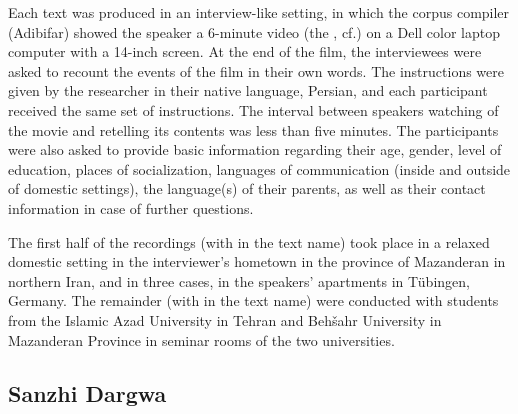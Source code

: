 Each text was produced in an interview-like setting, in which the corpus compiler (Adibifar) showed the speaker a 6-minute video (the , cf.\@ {}) on a Dell color laptop computer with a 14-inch screen. At the end of the film, the interviewees were asked to recount the events of the film in their own words. The instructions were given by the researcher in their native language, Persian, and each participant received the same set of instructions. The interval between speakers watching of the movie and retelling its contents was less than five minutes. The participants were also asked to provide basic information regarding their age, gender, level of education, places of socialization, languages of communication (inside and outside of domestic settings), the language(s) of their parents, as well as their contact information in case of further questions.

The first half of the recordings (with  in the text name) took place in a relaxed domestic setting in the interviewer's hometown in the province of Mazanderan in northern Iran, and in three cases, in the speakers' apartments in Tübingen, Germany. The remainder (with  in the text name) were conducted with students from the Islamic Azad University in Tehran and Behšahr University in Mazanderan Province in seminar rooms of the two universities.



\subsection{Sanzhi Dargwa}
\label{ssec:corpus-sanzhi}

\noindent{}

